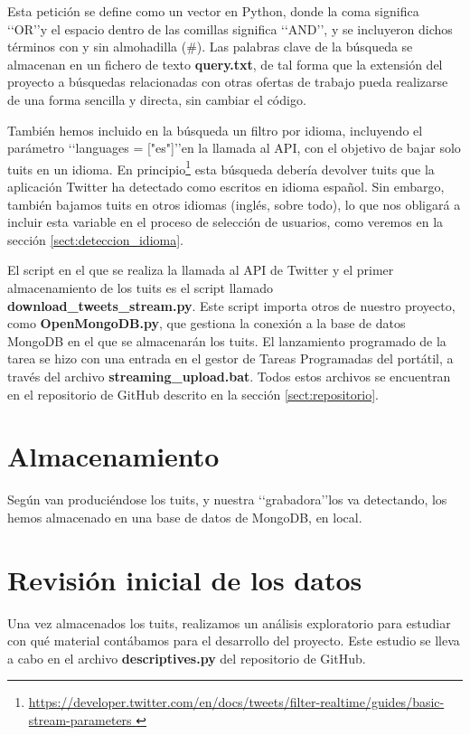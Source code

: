Esta petición se define como un vector en Python, donde la coma significa \lq\lq OR\rq\rq y el espacio
dentro de las comillas significa \lq\lq AND\rq\rq, y se incluyeron dichos términos con y sin almohadilla 
(\#). Las palabras clave de la búsqueda se almacenan en un fichero de texto {\bf query.txt},
de tal forma que la extensión del proyecto a búsquedas relacionadas con otras ofertas de trabajo
pueda realizarse de una forma sencilla y directa, sin cambiar el código.

También hemos incluido en la búsqueda un filtro por idioma, incluyendo el parámetro 
\lq\lq languages = ["es"]\rq\rq en la llamada al API, con el objetivo de bajar solo tuits
en un idioma. En principio\footnote{\url{https://developer.twitter.com/en/docs/tweets/filter-realtime/guides/basic-stream-parameters }}
esta búsqueda debería devolver tuits que la aplicación Twitter ha detectado como escritos en
idioma español. Sin embargo, también bajamos tuits en otros idiomas (inglés, sobre todo), lo que
nos obligará a incluir esta variable en el proceso de selección de usuarios, como veremos en la sección 
\ref{sect:deteccion_idioma}.

El script en el que se realiza la llamada al API de Twitter y el primer almacenamiento de los tuits
es el script llamado {\bf download\_tweets\_stream.py}. Este script importa otros
de nuestro proyecto, como {\bf OpenMongoDB.py}, que gestiona la conexión a la base de datos MongoDB
en el que se almacenarán los tuits. El lanzamiento programado de la tarea se hizo con una entrada en el gestor
de Tareas Programadas del portátil, a través del archivo {\bf streaming\_upload.bat}. Todos estos
archivos se encuentran en el repositorio de GitHub descrito en la sección \ref{sect:repositorio}.


\section{Almacenamiento}
Según van produciéndose los tuits, y nuestra \lq\lq grabadora\rq\rq los va detectando, los hemos almacenado
en una base de datos de MongoDB, en local.


\section{Revisión inicial de los datos}
Una vez almacenados los tuits, realizamos un análisis exploratorio para estudiar con qué material contábamos para el desarrollo del proyecto. Este estudio se lleva a cabo en el archivo {\bf descriptives.py} del repositorio de
GitHub.

